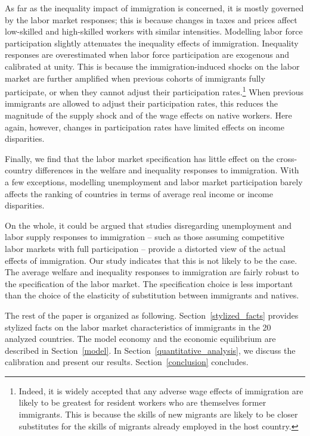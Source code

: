 \documentclass[a4paper,12pt]{article}
\begin{document}
As far as the inequality impact of immigration is concerned, it is mostly governed by the labor market responses; this is because changes in taxes and prices affect low-skilled and high-skilled workers with similar intensities. Modelling labor force participation slightly attenuates the inequality effects of immigration. Inequality responses are overestimated when labor force participation are exogenous and calibrated at unity. This is because the immigration-induced shocks on the labor market are further amplified when previous cohorts of immigrants fully participate, or when they cannot adjust their participation rates.\footnote{Indeed, it is widely accepted that any adverse wage effects of immigration are likely to be greatest for resident workers who are themselves former immigrants. This is because the skills of new migrants are likely to be closer substitutes for the skills of migrants already employed in the host country.} When previous immigrants are allowed to adjust their participation rates, this reduces the magnitude of the supply shock and of the wage effects on native workers. Here again, however, changes in participation rates have limited effects on income disparities.

Finally, we find that the labor market specification has little effect on the cross-country differences in the welfare and inequality responses to immigration. With a few exceptions, modelling unemployment and labor market participation barely affects the ranking of countries in terms of average real income or income disparities. 

On the whole, it could be argued that studies disregarding unemployment and labor supply responses to immigration -- such as those assuming competitive labor markets with full participation -- provide a distorted view of the actual effects of immigration. Our study indicates that this is not likely to be the case. The average welfare and inequality responses to immigration are fairly robust to the specification of the labor market. The specification choice is less important than the choice of the elasticity of substitution between immigrants and natives.

The rest of the paper is organized as following. Section~\ref{stylized_facts} provides stylized facts on the labor market characteristics of immigrants in the 20 analyzed countries. The model economy and the economic equilibrium are described in Section~\ref{model}. In Section~\ref{quantitative_analysis}, we discuss the calibration and present our results. Section~\ref{conclusion} concludes.
\end{document}

